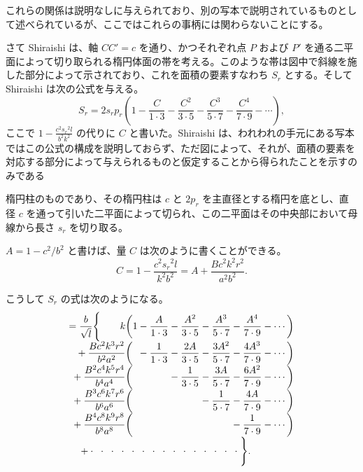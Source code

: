 \documentclass[11pt]{article}
\newcommand{\scanpage}[2]{\clearpage\setcounter{footnote}{0}\noindent{\footnotesize\color{gray}PDF #1 頁 · #2}\par\medskip}
\begin{document}
これらの関係は説明なしに与えられており、別の写本で説明されているものとして述べられているが、ここではこれらの事柄には関わらないことにする。

さて Shiraishi は、軸 $CC'=c$ を通り、かつそれぞれ点 $P$ および $P'$ を通る二平面によって切り取られる楕円体面の帯を考える。このような帯は図中で斜線を施した部分によって示されており、これを面積の要素すなわち $S_r$ とする。そして Shiraishi は次の公式を与える。
\[
S_r=2s_rp_r\left(1-\frac{C}{1\cdot3}-\frac{C^2}{3\cdot5}-\frac{C^3}{5\cdot7}-\frac{C^4}{7\cdot9}-\cdots\right),
\]
ここで $1-\frac{c^2{s_r}^2l}{b^2k^2}$ の代りに $C$ と書いた。Shiraishi は、われわれの手元にある写本ではこの公式の構成を説明しておらず、ただ図によって、それが、面積の要素を対応する部分によって与えられるものと仮定することから得られたことを示すのみである

\scanpage{0272}{印刷頁 258}
\noindent 楕円柱のものであり、その楕円柱は $c$ と $2p_r$ を主直径とする楕円を底とし、直径 $c$ を通って引いた二平面によって切られ、この二平面はその中央部において母線から長さ $s_r$ を切り取る。

$A=1-c^2/b^2$ と書けば、量 $C$ は次のように書くことができる。
\[
C=1-\frac{c^2s_r{}^2l}{k^2b^2}=A+\frac{Bc^2k^2r^2}{a^2b^2}.
\]

こうして $S_r$ の式は次のようになる。
\[
\begin{array}{r@{}l@{}l@{}l@{}l@{}l@{}l}
=\dfrac{b}{\sqrt{l}}\Biggl\{\qquad k\biggl( & 1 & {}-\dfrac{A}{1\cdot 3} & {}-\dfrac{A^2}{3\cdot 5} & {}-\dfrac{A^3}{5\cdot 7} & {}-\dfrac{A^4}{7\cdot 9} & {}-\cdots\biggr)\\[2mm]
{}+\dfrac{Bc^2k^3r^2}{b^2a^2}\biggl( & & {}-\dfrac{1}{1\cdot 3} & {}-\dfrac{2A}{3\cdot 5} & {}-\dfrac{3A^2}{5\cdot 7} & {}-\dfrac{4A^3}{7\cdot 9} & {}-\cdots\biggr)\\[2mm]
{}+\dfrac{B^2c^4k^5r^4}{b^4a^4}\biggl( & & & {}-\dfrac{1}{3\cdot 5} & {}-\dfrac{3A}{5\cdot 7} & {}-\dfrac{6A^2}{7\cdot 9} & {}-\cdots\biggr)\\[2mm]
{}+\dfrac{B^3c^6k^7r^6}{b^6a^6}\biggl( & & & & {}-\dfrac{1}{5\cdot 7} & {}-\dfrac{4A}{7\cdot 9} & {}-\cdots\biggr)\\[2mm]
{}+\dfrac{B^4c^8k^9r^8}{b^8a^8}\biggl( & & & & & {}-\dfrac{1}{7\cdot 9} & {}-\cdots\biggr)\\[2mm]
\multicolumn{7}{l}{\quad{}+\cdot\;\;\cdot\;\;\cdot\;\;\cdot\;\;\cdot\;\;\cdot\;\;\cdot\;\;\cdot\;\;\cdot\;\;\cdot\;\;\cdot\;\;\cdot\;\;\cdot\;\;\cdot\;\;\cdot\;\Biggr\}.}
\end{array}
\]
\end{document}
